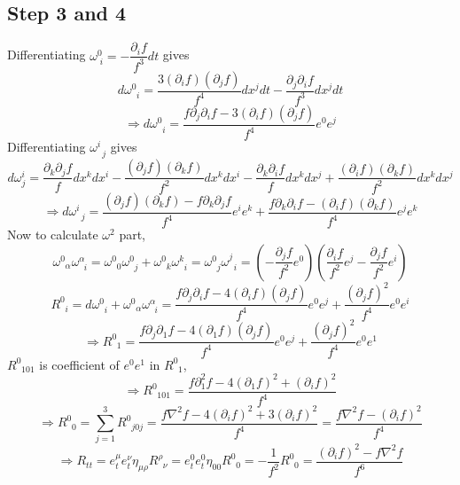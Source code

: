 ﻿\documentclass[12pt,a4paper]{article}
\begin{document}
\subsection{Step 3 and 4}
Differentiating $\omega^{0}_{\;i}=-\dfrac{\partial_{i}f}{f^{3}}dt$ gives
$$
d \omega^{0}_{\;\;i}=\frac{3\left(\partial_{i} f\right)\left(\partial_{j} f\right)}{f^{4}}  d x^{j} d t -\frac{\partial_{j} \partial_{i} f}{f^{3}} d x^{j} d t
$$
$$
\Rightarrow d \omega^{0}_{\;\;i}=\frac{f\partial_{j} \partial_{i} f -3\left(\partial_{i} f\right)\left(\partial_{j} f\right)}{f^{4}} e^{0}e^{j}
$$
Differentiating $\omega_{\;\;j}^{i}$ gives
$$
d \omega^{i}_{j}= \frac{\partial_{k} \partial_{j} f}{f} d x^{k} d x^{i}-\frac{(\partial_{j} f)\left(\partial_{k} f\right)}{f^{2}} d x^{k} d x^{i} -\frac{\partial_{k} \partial_{i} f}{f} d x^{k} d x^{j}+\frac{\left(\partial_{i} f\right)\left(\partial_{k} f\right)}{f^{2}} d x^{k} d x^{j}
$$
$$
\Rightarrow d \omega^{i}_{\;\;j}= \frac{(\partial_{j} f)\left(\partial_{k} f\right)-f\partial_{k} \partial_{j} f}{f^{4}}e^{i} e^{k} +\frac{f\partial_{k} \partial_{i} f-\left(\partial_{i} f\right)\left(\partial_{k} f\right)}{f^{4}} e^{j} e^{k}
$$
Now to calculate $\omega^{2}$ part,
$$
\omega_{\;\;\alpha}^{0} \omega^{\alpha}_{\;\;i}=\omega^{0}_{ \;\;0} \omega^{0}_{\;\;j} +\omega^{0}_{\;\;k} \omega^{k}_{\;\;i}=\omega^{0}_{\;\;j} \omega^{j}_{\;\;i}=\left(-\dfrac{\partial_{j}f}{f^{2}}e^{0} \right) \left(\frac{\partial_{i} f}{f^{2}} e^{j}-\frac{\partial_{j} f}{f^{2}} e^{i} \right)
$$
$$
R_{\;\;i}^{0}=d \omega^{0}_{\;\;i}+\omega_{\;\;\alpha}^{0} \omega^{\alpha}_{\;\;i}=\frac{f\partial_{j} \partial_{i} f -4\left(\partial_{i} f\right)\left(\partial_{j} f\right)}{f^{4}} e^{0}e^{j}+\frac{\left(\partial_{j}f \right)^{2}}{f^{4}}e^{0}e^{i}
$$
$$
\Rightarrow R_{\;\;1}^{0}=\frac{f\partial_{j} \partial_{1} f -4\left(\partial_{1} f\right)\left(\partial_{j} f\right)}{f^{4}} e^{0}e^{j}+\frac{\left(\partial_{j}f \right)^{2}}{f^{4}}e^{0}e^{1}
$$
$R_{\;\;1 0 1}^{0}$ is coefficient of $e^{0}e^{1}$ in $R_{\;\;1}^{0}$,
$$
\Rightarrow R_{\;\;1 0 1}^{0}=\frac{f\partial_{1}^{2} f -4\left(\partial_{1} f\right)^{2}+\left(\partial_{i} f\right)^{2}}{f^{4}} 
$$
$$
\Rightarrow R_{\;\;0}^{0}=\sum_{j=1}^{3} R_{\;\;j 0 j}^{0}=\frac{f \nabla^{2} f-4\left(\partial_{i} f\right)^{2}+3\left(\partial_{i} f\right)^{2}}{f^{4}}=\frac{f \nabla^{2} f-\left(\partial_{i} f\right)^{2}}{f^{4}}
$$
$$
\Rightarrow R_{tt}=e_{t}^{\mu} e_{t}^{\nu} \eta_{\mu \rho} R^{\rho}_{\;\;\nu}=e_{t}^{0} e_{t}^{0} \eta_{00} R^{0}_{\;\;0}=-\frac{1}{f^{2}} R^{0}_{\;\;0}=\frac{\left(\partial_{i} f\right)^{2}-f \nabla^{2} f}{f^{6}}
$$
\end{document}
